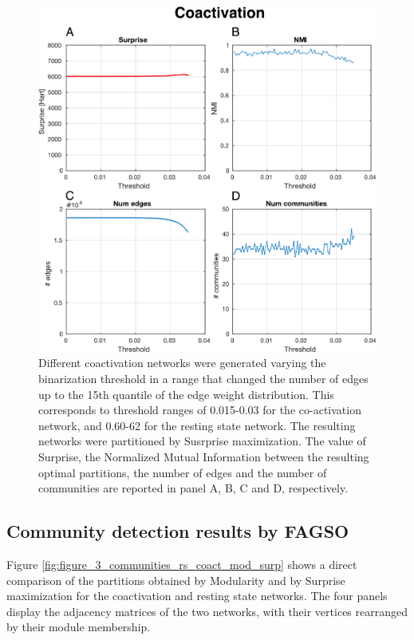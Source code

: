 \begin{figure}[htb!]
\centering
\includegraphics[width=0.7\linewidth]{images/coactivation_study_threshold.pdf}
\caption{Different coactivation networks were generated varying the binarization threshold in a range that changed the number of edges up to the 15th quantile of the edge weight distribution. This corresponds to threshold ranges of 0.015-0.03 for the co-activation network, and 0.60-62 for the resting state network. The resulting networks were partitioned by Susrprise maximization. The value of Surprise, the Normalized Mutual Information between the resulting optimal partitions, the number of edges and the number of communities are reported in panel A, B, C and D, respectively.}
\label{fig:figure_10_rs_threshold_study}
\end{figure}

\subsection{Community detection results by FAGSO}
Figure \ref{fig:figure_3_communities_rs_coact_mod_surp} shows a direct comparison of the partitions obtained by Modularity and by Surprise maximization for the coactivation and resting state networks. The four panels display the adjacency matrices of the two networks, with their vertices rearranged by their module membership.

